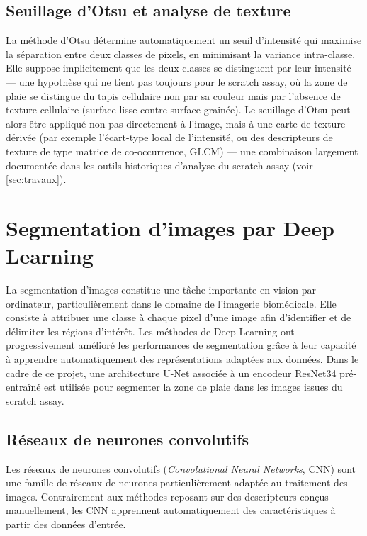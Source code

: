 \documentclass[12pt,a4paper]{report}
\begin{document}
\subsection{Seuillage d'Otsu et analyse de texture}

La méthode d'Otsu \cite{ref21} détermine automatiquement un seuil d'intensité qui maximise la séparation entre deux classes de pixels, en minimisant la variance intra-classe. Elle suppose implicitement que les deux classes se distinguent par leur intensité — une hypothèse qui ne tient pas toujours pour le scratch assay, où la zone de plaie se distingue du tapis cellulaire non par sa couleur mais par l'absence de texture cellulaire (surface lisse contre surface grainée). Le seuillage d'Otsu peut alors être appliqué non pas directement à l'image, mais à une carte de texture dérivée (par exemple l'écart-type local de l'intensité, ou des descripteurs de texture de type matrice de co-occurrence, GLCM) — une combinaison largement documentée dans les outils historiques d'analyse du scratch assay (voir \ref{sec:travaux}).

\section{Segmentation d'images par Deep Learning}
\label{sec:deep_learning}

La segmentation d'images constitue une tâche importante en vision par ordinateur, particulièrement dans le domaine de l'imagerie biomédicale. Elle consiste à attribuer une classe à chaque pixel d'une image afin d'identifier et de délimiter les régions d'intérêt. Les méthodes de Deep Learning ont progressivement amélioré les performances de segmentation grâce à leur capacité à apprendre automatiquement des représentations adaptées aux données. Dans le cadre de ce projet, une architecture U-Net associée à un encodeur ResNet34 pré-entraîné est utilisée pour segmenter la zone de plaie dans les images issues du scratch assay.

\subsection{Réseaux de neurones convolutifs}

Les réseaux de neurones convolutifs (\textit{Convolutional Neural Networks}, CNN) sont une famille de réseaux de neurones particulièrement adaptée au traitement des images. Contrairement aux méthodes reposant sur des descripteurs conçus manuellement, les CNN apprennent automatiquement des caractéristiques à partir des données d'entrée.
\end{document}
